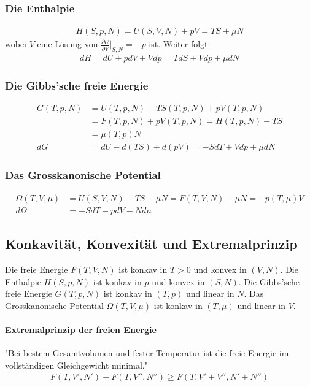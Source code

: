 \subsubsection{Die Enthalpie}
\begin{align*}
    H(S,p,N) = U(S,V,N) + p V = T S + \mu N
\end{align*}
wobei $V$ eine Lösung von $\frac{\partial U}{\partial V} \Big|_{S,N} = -p$ ist.
Weiter folgt:
\begin{align*}
    dH = dU + p dV + V dp = T dS + V dp + \mu dN
\end{align*}

\subsubsection{Die Gibbs'sche freie Energie}
\begin{align*}
    G(T,p,N) &= U(T,p,N) - T S(T,p,N) + p V(T,p,N)
    \\
    &= F(T,p,N) + p V(T,p,N) = H(T,p,N) - T S
    \\
    &= \mu(T,p) N 
    \\
    dG &= dU - d(TS) + d(pV) = -S dT + V dp + \mu dN
\end{align*}

\subsubsection{Das Grosskanonische Potential}
\begin{align*}
    \Omega(T,V,\mu) &= U(S,V,N) - T S - \mu N
    = F(T,V,N) - \mu N
    = -p(T,\mu) V
    \\
    d \Omega &= - S dT - p dV - N d \mu
\end{align*}

\subsection{Konkavität, Konvexität und Extremalprinzip}

Die freie Energie $F(T,V,N)$ ist konkav in $T>0$ und konvex in $(V,N)$.
Die Enthalpie $H(S,p,N)$ ist konkav in $p$ und konvex in $(S,N)$.
Die Gibbs'sche freie Energie $G(T,p,N)$ ist konkav in $(T,p)$ und linear in $N$.
Das Grosskanonische Potential $\Omega(T,V,\mu)$ ist konkav in $(T,\mu)$ und
linear in $V$.

\paragraph{Extremalprinzip der freien Energie}
"Bei bestem Gesamtvolumen und fester Temperatur ist die freie Energie im
vollständigen Gleichgewicht minimal."
\begin{align*}
    F(T,V',N') + F(T,V'',N'') \geq F(T,V' + V'' , N' + N'')
\end{align*}


